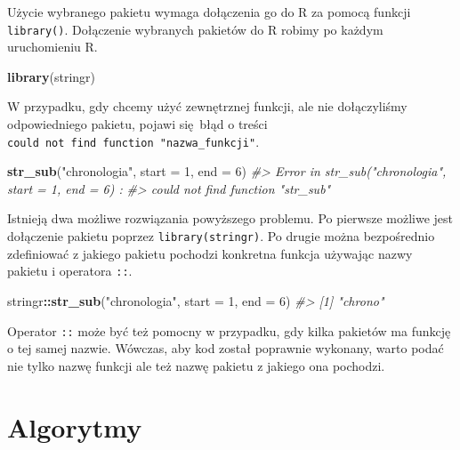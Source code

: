 \documentclass[paper=6in:9in,pagesize=pdftex,headinclude=on,footinclude=on,10pt]{scrbook}
\newenvironment{Shaded}{\begin{snugshade}}{\end{snugshade}}
\newcommand{\CommentTok}[1]{\textcolor[rgb]{0.56,0.35,0.01}{\textit{#1}}}
\newcommand{\DataTypeTok}[1]{\textcolor[rgb]{0.13,0.29,0.53}{#1}}
\newcommand{\DecValTok}[1]{\textcolor[rgb]{0.00,0.00,0.81}{#1}}
\newcommand{\KeywordTok}[1]{\textcolor[rgb]{0.13,0.29,0.53}{\textbf{#1}}}
\newcommand{\NormalTok}[1]{#1}
\newcommand{\OperatorTok}[1]{\textcolor[rgb]{0.81,0.36,0.00}{\textbf{#1}}}
\newcommand{\StringTok}[1]{\textcolor[rgb]{0.31,0.60,0.02}{#1}}
\let\BeginKnitrBlock\begin \let\EndKnitrBlock\end
\begin{document}
Użycie wybranego pakietu wymaga dołączenia go do R za pomocą funkcji \texttt{library()}.
Dołączenie wybranych pakietów do R robimy po każdym uruchomieniu R.

\begin{Shaded}
\begin{Highlighting}[]
\KeywordTok{library}\NormalTok{(stringr)}
\end{Highlighting}
\end{Shaded}

W przypadku, gdy chcemy użyć zewnętrznej funkcji, ale nie dołączyliśmy odpowiedniego pakietu, pojawi się~błąd o treści \texttt{could\ not\ find\ function\ "nazwa\_funkcji"}.

\begin{Shaded}
\begin{Highlighting}[]
\KeywordTok{str_sub}\NormalTok{(}\StringTok{"chronologia"}\NormalTok{, }\DataTypeTok{start =} \DecValTok{1}\NormalTok{, }\DataTypeTok{end =} \DecValTok{6}\NormalTok{)}
\CommentTok{#> Error in str_sub("chronologia", start = 1, end = 6) : }
\CommentTok{#>  could not find function "str_sub"}
\end{Highlighting}
\end{Shaded}

Istnieją dwa możliwe rozwiązania powyższego problemu.
Po pierwsze możliwe jest dołączenie pakietu poprzez \texttt{library(stringr)}.
Po drugie można bezpośrednio zdefiniować z jakiego pakietu pochodzi konkretna funkcja używając nazwy pakietu i operatora \texttt{::}.

\begin{Shaded}
\begin{Highlighting}[]
\NormalTok{stringr}\OperatorTok{::}\KeywordTok{str_sub}\NormalTok{(}\StringTok{"chronologia"}\NormalTok{, }\DataTypeTok{start =} \DecValTok{1}\NormalTok{, }\DataTypeTok{end =} \DecValTok{6}\NormalTok{)}
\CommentTok{#> [1] "chrono"}
\end{Highlighting}
\end{Shaded}

\BeginKnitrBlock{rmdinfo}
Operator \texttt{::} może być też pomocny w przypadku, gdy kilka pakietów ma funkcję o tej samej nazwie.
Wówczas, aby kod został poprawnie wykonany, warto podać nie tylko nazwę funkcji ale też nazwę pakietu z jakiego ona pochodzi.
\EndKnitrBlock{rmdinfo}

\hypertarget{algorytmy}{%
\section{Algorytmy}\label{algorytmy}}
\end{document}
